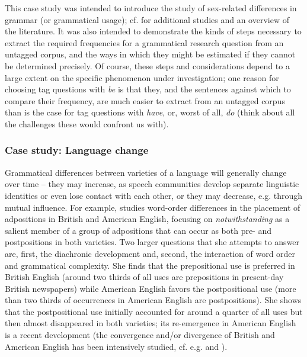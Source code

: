 This case study was intended to introduce the study of sex\hyp{}related differences in grammar  (or grammatical usage); cf. \citet{mondorf_gender_2004} for additional studies and an overview of the literature. It was also intended to demonstrate the kinds of steps necessary to extract  the required frequencies for a grammatical research question from an untagged  corpus, and the ways in which they might be estimated if they cannot be determined precisely. Of course, these steps and considerations depend to a large extent on the specific phenomenon under investigation; one reason for choosing tag questions  with \textit{be} is that they, and the sentences against which to compare their frequency,  are much easier to extract  from an untagged  corpus than is the case for tag questions with \textit{have}, or, worst of all, \textit{do} (think about all the challenges these would confront us with).

\subsubsection{Case study: Language change}
\label{sec:languagechange}

Grammatical  differences between varieties  of a language will generally change over time -- they may increase, as speech communities develop separate linguistic identities or even lose contact with each other, or they may decrease, e.g. through mutual influence. For example, \citet{rohdenburg_prepositions_2009} studies word\hyp{}order differences in the placement of adpositions  in British  and American  English, focusing on \textit{notwithstanding} as a salient member of a group of adpositions  that can occur as both pre- and postpositions  in both varieties. Two larger questions that she attempts to answer are, first, the diachronic  development and, second, the interaction of word order  and grammatical  complexity.  She finds that the prepositional  use is preferred in British English (around two thirds of all uses are prepositions  in present\hyp{}day British newspapers)  while American English favors the postpositional use (more than two thirds of occurrences in American English are postpositions).  She shows that the postpositional  use initially accounted for around a quarter of all uses but then almost disappeared in both varieties;  its re\hyp{}emergence in American English is a recent development (the convergence and\slash or divergence of British  and American English has been intensively studied, cf. e.g. \citealt{hundt_has_1997} and \citealt{rohdenburg_colonial_2009}).

